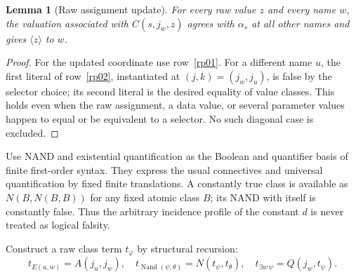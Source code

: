 \documentclass[11pt]{article}
\newtheorem{lemma}[theorem]{Lemma}
\newcommand{\cl}[1]{\langle#1\rangle}
\begin{document}
\begin{lemma}[Raw assignment update]\label{rp-update}
For every raw value $z$ and every name $w$, the valuation associated with
$C(s,j_w,z)$ agrees with $\alpha_s$ at all other names and gives
$\cl z$ to $w$.
\end{lemma}
\begin{proof}
For the updated coordinate use row~\ref{rp01}. For a different name
$u$, the first literal of row~\ref{rp02}, instantiated at
$(j,k)=(j_w,j_u)$, is false by the selector choice; its second literal
is the desired equality of value classes. This holds even when the raw
assignment, a data value, or several parameter values happen to equal or
be equivalent to a selector. No such diagonal case is excluded.
\end{proof}

Use NAND and existential quantification as the Boolean and quantifier
basis of finite first-order syntax. They express the usual connectives
and universal quantification by fixed finite translations. A constantly
true class is available as $N(B,N(B,B))$ for any fixed atomic class $B$;
its NAND with itself is constantly false. Thus the arbitrary incidence
profile of the constant $d$ is never treated as logical falsity.

Construct a raw class term $t_\varphi$ by structural recursion:
\[
 t_{E(u,w)}=A(j_u,j_w),\quad
 t_{\operatorname{Nand}(\psi,\theta)}=N(t_\psi,t_\theta),\quad
 t_{\exists w\,\psi}=Q(j_w,t_\psi).
\]
\end{document}

